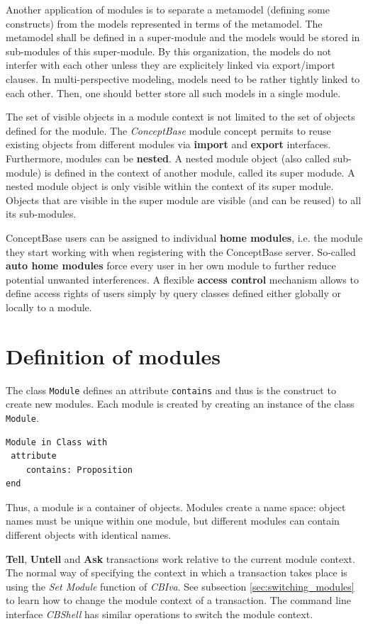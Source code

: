 Another application of modules is to separate a metamodel (defining some constructs) from
the models represented in terms of the metamodel. The metamodel shall be defined in
a super-module and the models would be stored in sub-modules of this super-module. 
By this organization, the models do not interfer with each other unless they are
explicitely linked via export/import clauses. 
In multi-perspective modeling, models need to be rather tightly linked to each other.
Then, one should better store all such models in a single module. 

The set of visible objects in a module context is not limited  to the set of objects
defined for the module.
The {\em ConceptBase} module concept permits to reuse existing objects from different modules
via {\bf import} and {\bf export} interfaces. Furthermore,  modules can be {\bf nested}.
A nested module object (also called sub-module) is defined in the
context of another module, called its super modude.
A nested module object is only visible within the context of its super module.
Objects that are visible in the super module are visible (and can be reused) to all its
sub-modules. 

ConceptBase users can be assigned to individual {\bf home modules}, i.e. the module
they start working with when registering with the ConceptBase server. So-called
{\bf auto home modules} force every user in her own module to further reduce
potential unwanted interferences. A flexible {\bf access control} mechanism
allows to define access rights of users simply by query classes defined either globally
or locally to a module. 


\section{Definition of modules}

The class {\tt Module} defines an attribute {\tt contains} and thus is the construct to
create new modules. Each module is created by creating an instance of the class {\tt Module}.

\begin{verbatim}
Module in Class with
 attribute
    contains: Proposition
end
\end{verbatim}


Thus, a module is a container of objects. Modules create a name space: object names must be unique within
one module, but different modules can contain different objects with identical names.

{\bf Tell}, {\bf Untell} and {\bf Ask} transactions work relative to the current module context.
The normal way of specifying the context in which a transaction  takes place
is using the {\em Set Module} function of {\em CBIva}. See subsection \ref{sec:switching_modules}
to learn how to change the module context of a transaction. The command line interface
{\em CBShell\/} has similar operations to switch the module context.

